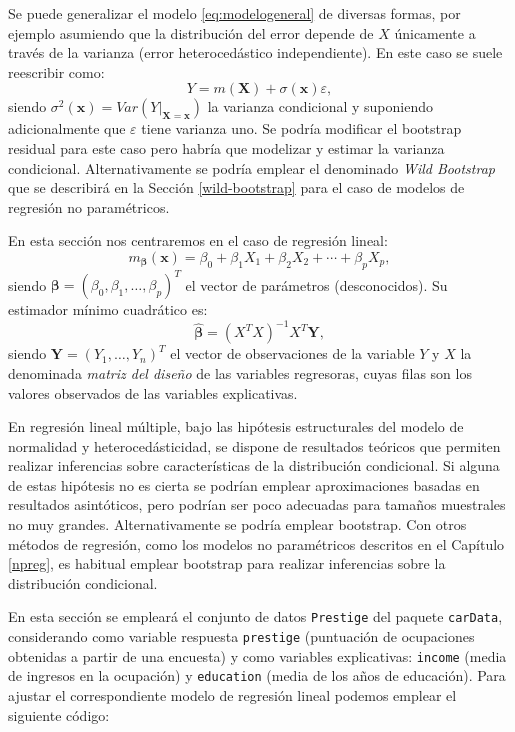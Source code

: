 \documentclass[]{book}
\theoremstyle{break}
\theoremstyle{definition}
\theoremstyle{definition}
\theoremstyle{definition}
\theoremstyle{remark}
\begin{document}
Se puede generalizar el modelo \eqref{eq:modelogeneral} de diversas
formas, por ejemplo asumiendo que la distribución del error depende de
\(X\) únicamente a través de la varianza (error heterocedástico
independiente). En este caso se suele reescribir como:
\[Y = m(\mathbf{X}) + \sigma(\mathbf{x}) \varepsilon,\] siendo
\(\sigma^2(\mathbf{x}) = Var\left( \left. Y\right\vert_{\mathbf{X}=\mathbf{x}} \right)\)
la varianza condicional y suponiendo adicionalmente que \(\varepsilon\)
tiene varianza uno. Se podría modificar el bootstrap residual para este
caso pero habría que modelizar y estimar la varianza condicional.
Alternativamente se podría emplear el denominado \emph{Wild Bootstrap}
que se describirá en la Sección \ref{wild-bootstrap} para el caso de
modelos de regresión no paramétricos.

En esta sección nos centraremos en el caso de regresión lineal:
\[m_{\boldsymbol{\beta}}(\mathbf{x}) =  \beta_{0} + \beta_{1}X_{1} + \beta_{2}X_{2} + \cdots + \beta_{p}X_{p},\]
siendo
\(\boldsymbol{\beta} = \left( \beta_{0}, \beta_{1}, \ldots, \beta_{p} \right)^{T}\)
el vector de parámetros (desconocidos). Su estimador mínimo cuadrático
es:
\[\boldsymbol{\hat{\beta}} = \left( X^{T}X\right)^{-1}X^{T}\mathbf{Y},\]
siendo \(\mathbf{Y} = \left( Y_{1}, \ldots, Y_{n} \right)^{T}\) el
vector de observaciones de la variable \(Y\) y \(X\) la denominada
\emph{matriz del diseño} de las variables regresoras, cuyas filas son
los valores observados de las variables explicativas.

En regresión lineal múltiple, bajo las hipótesis estructurales del
modelo de normalidad y heterocedásticidad, se dispone de resultados
teóricos que permiten realizar inferencias sobre características de la
distribución condicional. Si alguna de estas hipótesis no es cierta se
podrían emplear aproximaciones basadas en resultados asintóticos, pero
podrían ser poco adecuadas para tamaños muestrales no muy grandes.
Alternativamente se podría emplear bootstrap. Con otros métodos de
regresión, como los modelos no paramétricos descritos en el Capítulo
\ref{npreg}, es habitual emplear bootstrap para realizar inferencias
sobre la distribución condicional.

En esta sección se empleará el conjunto de datos \texttt{Prestige} del
paquete \texttt{carData}, considerando como variable respuesta
\texttt{prestige} (puntuación de ocupaciones obtenidas a partir de una
encuesta) y como variables explicativas: \texttt{income} (media de
ingresos en la ocupación) y \texttt{education} (media de los años de
educación). Para ajustar el correspondiente modelo de regresión lineal
podemos emplear el siguiente código:
\end{document}
